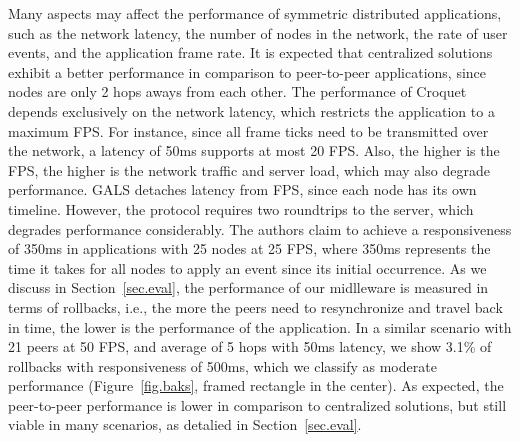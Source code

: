 \documentclass[12pt]{article}
\begin{document}
Many aspects may affect the performance of symmetric distributed applications,
such as
    the network latency,
    the number of nodes in the network,
    the rate of user events,
    and the application frame rate.
%
It is expected that centralized solutions exhibit a better performance in
comparison to peer-to-peer applications, since nodes are only 2 hops aways from
each other.
%
The performance of Croquet depends exclusively on the network latency, which
restricts the application to a maximum FPS.
For instance, since all frame ticks need to be transmitted over the network,
a latency of 50ms supports at most 20 FPS.
Also, the higher is the FPS, the higher is the network traffic and server load,
which may also degrade performance.
%
GALS detaches latency from FPS, since each node has its own timeline.
However, the protocol requires two roundtrips to the server, which degrades
performance considerably.
The authors claim to achieve a responsiveness of 350ms in applications with
25 nodes at 25 FPS, where 350ms represents the time it takes for all nodes to
apply an event since its initial occurrence.
%
As we discuss in Section~\ref{sec.eval}, the performance of our midlleware is
measured in terms of rollbacks, i.e., the more the peers need to resynchronize
and travel back in time, the lower is the performance of the application.
In a similar scenario with 21 peers at 50 FPS, and average of 5 hops with 50ms
latency, we show 3.1\% of rollbacks with responsiveness of 500ms, which we
classify as moderate performance (Figure~\ref{fig.baks}, framed rectangle in
the center).
As expected, the peer-to-peer performance is lower in comparison to centralized
solutions, but still viable in many scenarios, as detalied in
Section~\ref{sec.eval}.

\end{document}
